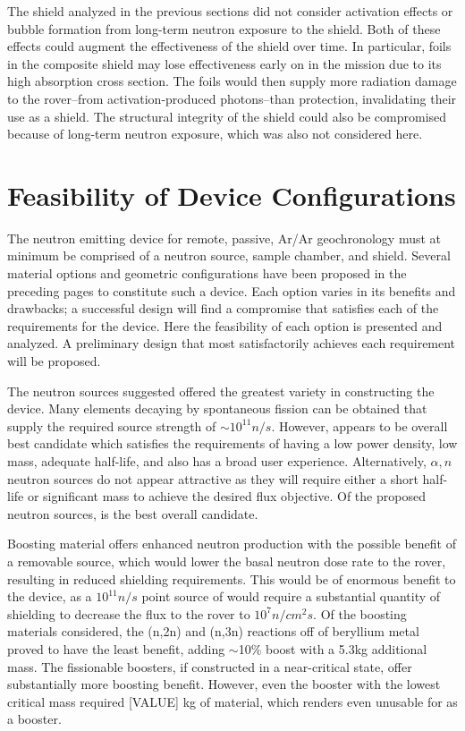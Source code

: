\documentclass{mc2015}
\begin{document}
The shield analyzed in the previous sections did not consider activation effects or bubble formation from long-term neutron exposure to the shield. Both of these effects could augment the effectiveness of the shield over time. In particular, foils in the composite shield may lose effectiveness early on in the mission due to its high absorption cross section. The foils would then supply more radiation damage to the rover--from activation-produced photons--than protection, invalidating their use as a shield. The structural integrity of the shield could also be compromised because of long-term neutron exposure, which was also not considered here.  


\section{Feasibility of Device Configurations}
\label{sec:feasibility}

The neutron emitting device for remote, passive, Ar/Ar geochronology must at minimum be comprised of a neutron source, sample chamber, and shield. Several material options and geometric configurations have been proposed in the preceding pages to constitute such a device. Each option varies in its benefits and drawbacks; a successful design will find a compromise that satisfies each of the requirements for the device. Here the feasibility of each option is presented and analyzed. A preliminary design that most satisfactorily achieves each requirement will be proposed. 

The neutron sources suggested offered the greatest variety in constructing the device. Many elements decaying by spontaneous fission can be obtained that supply the required source strength of $\sim10^{11} n/s$. However,  appears to be overall best candidate which satisfies the requirements of having a low power density, low mass, adequate half-life, and also has a broad user experience. Alternatively, $\alpha,n$ neutron sources do not appear attractive as they will require either a short half-life or significant mass to achieve the desired flux objective. Of the proposed neutron sources,  is the best overall candidate. 

Boosting material offers enhanced neutron production with the possible benefit of a removable source, which would lower the basal neutron dose rate to the rover, resulting in reduced shielding requirements. This would be of enormous benefit to the device, as a $10^{11} n/s$ point source of  would require a substantial quantity of shielding to decrease the flux to the rover to $10^{7} n/{{cm^2}s}$. Of the boosting materials considered, the (n,2n) and (n,3n) reactions off of beryllium metal proved to have the least benefit, adding $\sim$10\% boost with a 5.3kg additional mass. The fissionable boosters, if constructed in a near-critical state, offer substantially more boosting benefit. However, even the booster with the lowest critical mass required [VALUE] kg of material, which renders even  unusable for as a booster. 
\end{document}
